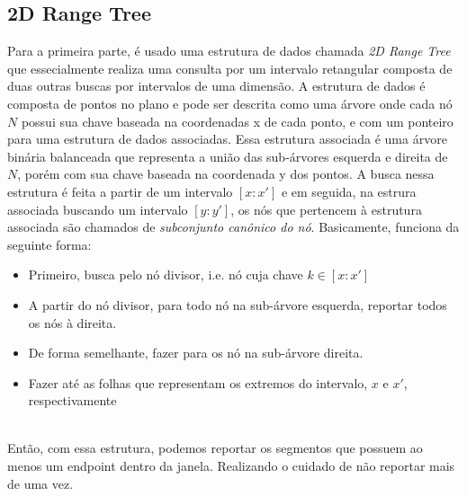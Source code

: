 \documentclass{article}
\theoremstyle{definition}
\begin{document}
\subsection{2D Range Tree}
\hspace*{15pt} Para a primeira parte, é usado uma estrutura de dados chamada
\textit{2D Range Tree} que essecialmente realiza uma consulta por um intervalo 
retangular composta de duas outras buscas por intervalos de uma dimensão. A 
estrutura de dados é composta de pontos no plano e pode ser descrita como uma 
árvore onde cada nó $N$ possui sua chave baseada na coordenadas x de cada ponto, e com
um ponteiro para uma estrutura de dados associadas. Essa estrutura associada é 
uma árvore binária balanceada que representa a união das sub-árvores esquerda e 
direita de $N$, porém com sua chave baseada na coordenada y dos pontos. A busca 
nessa estrutura é feita a partir de um intervalo $[x:x']$ e em seguida, na estrura
associada buscando um intervalo $[y:y']$, os nós que pertencem à estrutura associada
são chamados de \textit{subconjunto canônico do nó}. Basicamente, funciona da 
seguinte forma:\\
 \begin{itemize}
    \item Primeiro, busca pelo nó divisor, i.e. nó cuja chave $k \in [x:x']$ 
    \item A partir do nó divisor, para todo nó na sub-árvore esquerda, reportar
        todos os nós à direita.
    \item De forma semelhante, fazer para os nó na sub-árvore direita.
    \item Fazer até as folhas que representam os extremos do intervalo,
         $x$ e $x'$, respectivamente
 \end{itemize}
\\
\hspace*{15pt} Então, com essa estrutura, podemos reportar os segmentos que possuem
ao menos um endpoint dentro da janela. Realizando o cuidado de não reportar mais 
de uma vez.
\\
\end{document}
